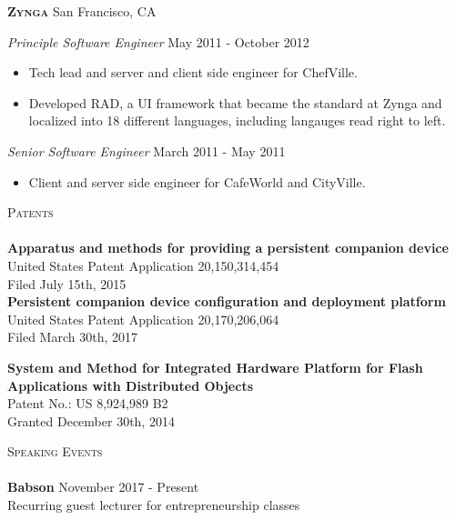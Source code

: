 \documentclass[a4paper]{article}
\newcommand{\lineunder} {
    \vspace*{-8pt} \\
    \hspace*{-18pt} \hrulefill \\
}
\newcommand{\header} [1] {
    {\hspace*{-18pt}\vspace*{6pt} \textsc{#1}}
    \vspace*{-6pt} \lineunder
}
\begin{document}
\textbf{\textsc{Zynga}} \hfill San Francisco, CA\\
\vspace{2mm}

\begin{addmargin}[1em]{0em}

\textit{Principle Software Engineer} \hfill May 2011 - October 2012\\
\vspace{-1mm}
\begin{itemize} \itemsep 1pt
    \item Tech lead and server and client side engineer for ChefVille.
    \item Developed RAD, a UI framework that became the standard at Zynga and localized
    into 18 different languages, including langauges read right to left.
\end{itemize}
\textit{Senior Software Engineer} \hfill March 2011 - May 2011\\
\vspace{-1mm}
\begin{itemize} \itemsep 1pt
    \item Client and server side engineer for CafeWorld and CityVille.
\end{itemize}
\end{addmargin}

\header{Patents}
\textbf{Apparatus and methods for providing a persistent companion device}\\
United States Patent Application 20,150,314,454\\
Filed July 15th, 2015\\

\vspace*{2mm}
\textbf{Persistent companion device configuration and deployment platform}\\
United States Patent Application 20,170,206,064\\
Filed March 30th, 2017

\vspace*{2mm}
\textbf{System and Method for Integrated Hardware Platform for Flash Applications
with Distributed Objects}\\
Patent No.: US 8,924,989 B2\\
Granted December 30th, 2014 \\
\vspace*{4mm}

\header{Speaking Events}
\textbf{Babson} \hfill November 2017 - Present\\
Recurring guest lecturer for entrepreneurship classes 
\vspace*{2mm}
\end{document}
